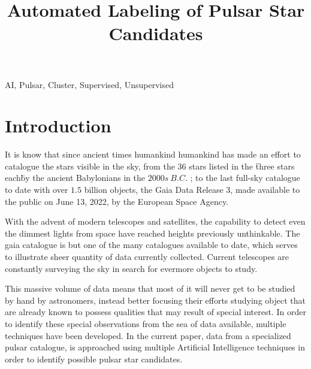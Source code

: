 \documentclass[conference]{IEEEtran}
\begin{document}
\title{Automated Labeling of Pulsar Star Candidates}

\author{
    }

\maketitle

\begin{abstract}
    \todo{}
\end{abstract}

\begin{IEEEkeywords}
    AI, Pulsar, Cluster, Supervised, Unsupervised
\end{IEEEkeywords}

\section{Introduction}
It is know that since ancient times humankind humankind has made an effort to
catalogue the stars visible in the sky, from the $36$ stars listed in the
\"three stars each\" by the ancient Babylonians in the $2000s\ B.C.$
\cite{astronomy:history:north}; to the last full-sky catalogue to date with over
$1.5$ billion objects, the Gaia Data Release 3\cite{gaia:dr3:esa}, made available
to the public on June 13, 2022, by the European Space Agency.

With the advent of modern telescopes and satellites, the capability to detect
even the dimmest lights from space have reached heights previously unthinkable.
The gaia catalogue is but one of the many catalogues available to date, which
serves to illustrate sheer quantity of data currently collected. Current
telescopes are constantly surveying the sky in search for evermore objects to study.

This massive volume of data means that most of it will never get to be studied
by hand by astronomers, instead better focusing their efforts studying object
that are already known to possess qualities that may result of special interest.
In order to identify these special observations from the sea of data available,
multiple techniques have been developed.\cite{pulsar:dataset:explanation:lyon} In the
current paper, data from a specialized pulsar catalogue\cite{pulsar:dataset:lyon},
is approached using multiple Artificial Intelligence techniques in order to
identify possible pulsar star candidates.
\end{document}
